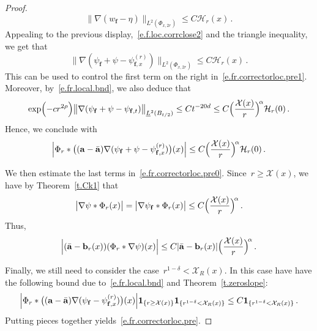 \documentclass[11pt,twoside]{article} %
\numberwithin{equation}{section}
\theoremstyle{definition}
\renewcommand{\b}{\ensuremath{\mathbf{b}}}
\newcommand{\f}{\mathbf{f}}
\renewcommand{\a}{\mathbf{a}}
\newcommand{\ahom}{\bar{\a}}
\newcommand{\X}{\mathcal{X}}
\newcommand{\indc}{\boldsymbol{1}}
\begin{document}
\begin{proof}
\begin{equation*}  
\big\| \nabla (w_{\f} - \eta)\big\|_{L^2(\Phi_{x,2r})} 
\leq 
C \mathcal{H}_r(x)
\,.
\end{equation*}
Appealing to the previous display,~\eqref{e.f.loc.corrclose2} and the triangle inequality, we get that 
\begin{equation*}  
\big\| \nabla (\psi_{\f} + \psi - \psi_{\f,x}^{(r)} )\big\|_{L^2(\Phi_{x,2r})}  
\leq 
C \mathcal{H}_r(x)
 \,.
\end{equation*}
This can be used to control the first term on the right in~\eqref{e.fr.correctorloc.pre1}. 
Moreover, by~\eqref{e.fr.local.bnd}, we also deduce that
\begin{equation*}  
 \exp\Bigl( - c r^{2\rho} \Bigr)\big\| \nabla (\psi_{\f}  + \psi -  \psi_{\f,t} )\big\|_{\underline{L}^2(B_{t/2})}  
 \leq 
 C t^{-20d} 
 \leq 
 C \Bigl( \frac{\X(x)}{r} \Bigr)^{\! \alpha}   \mathcal{H}_r(0) \,.
\end{equation*}
Hence, we conclude with
\begin{equation*}  
\Bigl| 
\Phi_r \ast  \bigl(  (\a - \ahom) \nabla (\psi_{\f}  + \psi -  \psi_{\f,x}^{(r)})  \bigr)(x) 
\Bigr| 
\leq 
 C \Bigl( \frac{\X(x)}{r} \Bigr)^{\! \alpha}   \mathcal{H}_r(0)
 \,.
\end{equation*}

We then estimate the last terms in~\eqref{e.fr.correctorloc.pre0}. Since~$r \geq \X(x)$, we have by Theorem~\ref{t.Ck1} that 
\begin{equation*}  
\big| \nabla  \psi \ast \Phi_{r}(x)  \big|  
=
\big| \nabla \psi_{\f} \ast \Phi_{r}(x) \big| 
\leq 
C \Bigl( \frac{\X(x)}{r} \Bigr)^{\! \alpha} 
\,.
\end{equation*}
Thus,
\begin{equation*}  
\Bigl|  (\ahom - \b_{r}(x)) (\Phi_r \ast \nabla \psi)(x) \Bigr|  \leq C | \ahom - \b_{r}(x) | \Bigl( \frac{\X(x)}{r} \Bigr)^{\! \alpha} \,.
\end{equation*}

Finally, we still need to consider the case~$r^{1-\delta} < \X_{R}(x)$. In this case have have the following bound due to~\eqref{e.fr.local.bnd} and Theorem~\ref{t.zeroslope}:
\begin{equation} 
\label{e.fr.correctorloc2}
\Bigl| 
\Phi_r \ast  \bigl(  (\a - \ahom) \nabla (\psi_{\f}  -  \psi_{\f,x}^{(r)})  \bigr)(x) 
\Bigr| \indc_{\{ r \geq \X(x)\} } \indc_{\{ r^{1-\delta} < \X_{R}(x) \}}
\leq 
C 
\indc_{\{ r^{1-\delta} < \X_{R}(x) \}}
\,.
\end{equation}
Putting pieces together yields~\eqref{e.fr.correctorloc.pre}. 





\end{proof}
\end{document}
